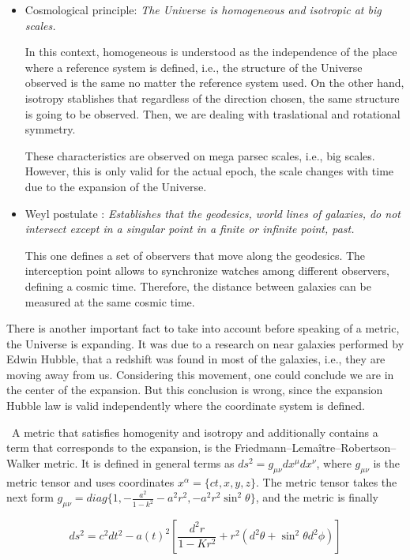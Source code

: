 \begin{itemize}
\item Cosmological principle: \emph{ The Universe is homogeneous and isotropic 
at big scales.}

In this context, homogeneous is understood as the independence of the place 
where a reference system is defined, i.e., the structure of the Universe observed 
is the same no matter the reference system used. 
On the other hand, isotropy stablishes that regardless of the direction chosen, 
the same structure is going to be observed. Then, we are dealing with traslational
and rotational symmetry. 

These characteristics are observed on mega parsec scales, i.e., big scales. 
However, this is only valid for the actual epoch, the scale changes with time due 
to the expansion of the Universe. 


\item Weyl postulate :\emph{ Establishes that the geodesics, world lines of 
galaxies, do not intersect except in a singular point in a finite or infinite 
point, past.} 

This one defines a set of observers that move along the geodesics. 
The interception point allows to synchronize watches among different observers,
defining a cosmic time. Therefore, the distance between galaxies can
be measured at the same cosmic time. 

\end{itemize} 

There is another important fact to take into account before speaking of a metric,
the Universe is expanding. It was due to a research on near galaxies performed
by Edwin Hubble, that a redshift was found in most of the galaxies, i.e., they
are moving away from us. 
Considering this movement, one could conclude we are in the center of the 
expansion. But this conclusion is wrong, since the expansion Hubble law is
valid independently where the coordinate system is defined. 

\
A metric that satisfies homogenity and isotropy and additionally
contains a term that corresponds to the expansion, is the 
Friedmann–Lemaître–Robertson–Walker metric. It is defined in 
general terms as $ds^2 = g_{\mu\nu}dx^{\mu}dx^{\nu}$, where $g_{\mu\nu}$
is the metric tensor and uses coordinates $x^{\alpha} = \{ct,x,y,z\}$.
The metric tensor takes the next form $ g_{\mu\nu} = diag\{1,-\frac{a^2}{1-k^2}
-a^2r^2,-a^2r^2\sin^2\theta\}$, and the metric is finally 

\begin{equation}
ds^2= c^2dt^2-a(t)^2\left[\frac{d^2r}{1-Kr^2} +r^2(d^2\theta
 + \sin^2\theta d^2\phi )\right]
\label{metric}
\end{equation} 	

